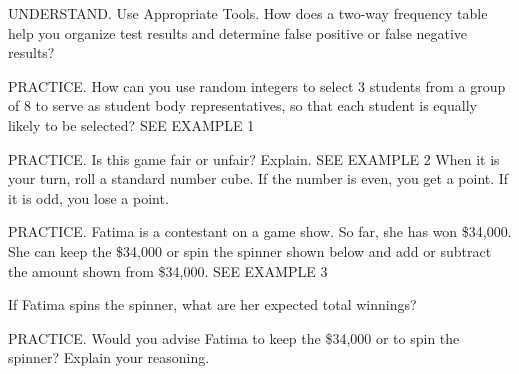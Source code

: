 \documentclass{article}
\newenvironment{practice}[2]{}{}        %
\newcommand{\answer}[1]{}               %
\newcommand{\placeholder}[2]{}          %
\newcommand{\te}[1]{}                   %
\begin{document}
\begin{practice}{14}{1}
UNDERSTAND. Use Appropriate Tools. How does a two-way frequency table help you organize test results and determine false positive or false negative results?
\answer{Possible answer: Using columns that are labeled with ``positive'' and ``negative'' results makes it easier to identify false positive and false negatives since they are complements of the true positive and true negative results.}
\end{practice}
\begin{practice}{15}{2}
PRACTICE. How can you use random integers to select 3 students from a group of 8 to serve as student body representatives, so that each student is equally likely to be selected? SEE EXAMPLE 1
\answer{Assign numbers 0 through 7 to each of the candidates, and then generate one of the eight integers at random three times in a row. If the same number (student) is selected during the second or third trials, ignore the number and generate another number.}
\te{Answers for Exercises 15--20 are printed on the next page.}
\end{practice}
\begin{practice}{16}{1}
PRACTICE. Is this game fair or unfair? Explain. SEE EXAMPLE 2
When it is your turn, roll a standard number cube. If the number is even, you get a point. If it is odd, you lose a point.
\answer{Fair; even numbers have the same number of chances, \{2, 4, 6\}, as odd numbers \{1, 3, 5\}.}
\end{practice}
\begin{practice}{17}{2}
PRACTICE. Fatima is a contestant on a game show. So far, she has won \$34,000. She can keep the \$34,000 or spin the spinner shown below and add or subtract the amount shown from \$34,000. SEE EXAMPLE 3
\placeholder{diagram}{Game-show contestant beside wheel with eight equal sectors and fixed yellow pointer at top. Clockwise from top: pink -\$4,000; green +\$3,000; orange -\$6,000; pale yellow +\$6,000; turquoise -\$1,000; pink +\$4,000; yellow -\$5,000; salmon +\$2,000.}
If Fatima spins the spinner, what are her expected total winnings?
\answer{\$33,875}
\end{practice}
\begin{practice}{18}{3}
PRACTICE. Would you advise Fatima to keep the \$34,000 or to spin the spinner? Explain your reasoning.
\answer{She should keep what she has (and not spin) because the game is not fair and she is more likely to lose money than win.}
\te{Printed ``more likely to lose money than win''; the eight equal sectors include four gains and four losses, but the expected change is negative.}
\end{practice}
\end{document}
